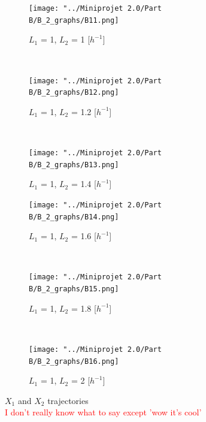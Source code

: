 \documentclass[10pt,a4paper,oneside,twocolumn]{article}
\newcommand{\red}[1]{\textcolor{red}{#1}}
\numberwithin{equation}{section} %
\begin{document}
    \begin{figure}
    \centering
	\begin{subfigure}[b]{0.32\textwidth}
	    \texttt{[image: "../Miniprojet 2.0/Part B/B\_2\_graphs/B11.png]}
	    \caption{$L_1$ = 1, $L_2$ = 1 [$h^{-1}$]}
	\end{subfigure}
	~ 
	\begin{subfigure}[b]{0.32\textwidth}
	    \texttt{[image: "../Miniprojet 2.0/Part B/B\_2\_graphs/B12.png]}
	    \caption{$L_1$ = 1, $L_2$ = 1.2 [$h^{-1}$]}
	\end{subfigure}
	~ 
	\begin{subfigure}[b]{0.32\textwidth}
	    \texttt{[image: "../Miniprojet 2.0/Part B/B\_2\_graphs/B13.png]}
	    \caption{$L_1$ = 1, $L_2$ = 1.4 [$h^{-1}$]}
	\end{subfigure}
	 
	\begin{subfigure}[b]{0.32\textwidth}
	    \texttt{[image: "../Miniprojet 2.0/Part B/B\_2\_graphs/B14.png]}
	    \caption{$L_1$ = 1, $L_2$ = 1.6 [$h^{-1}$]}
	\end{subfigure}
	~ 
	\begin{subfigure}[b]{0.32\textwidth}
	    \texttt{[image: "../Miniprojet 2.0/Part B/B\_2\_graphs/B15.png]}
	    \caption{$L_1$ = 1, $L_2$ = 1.8 [$h^{-1}$]}
	\end{subfigure}
	~ 
	\begin{subfigure}[b]{0.32\textwidth}
	    \texttt{[image: "../Miniprojet 2.0/Part B/B\_2\_graphs/B16.png]}
	    \caption{$L_1$ = 1, $L_2$ = 2 [$h^{-1}$]}
	\end{subfigure}

	\caption{$X_1$ and $X_2$ trajectories \\
	\red{I don't really know what to say except 'wow it's cool'}}
    \end{figure}
\end{document}
